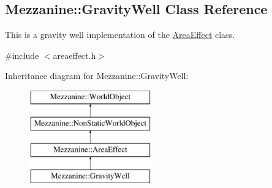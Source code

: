 \hypertarget{classMezzanine_1_1GravityWell}{
\subsection{Mezzanine::GravityWell Class Reference}
\label{classMezzanine_1_1GravityWell}
}


This is a gravity well implementation of the \hyperlink{classMezzanine_1_1AreaEffect}{AreaEffect} class.  




{\ttfamily \#include $<$areaeffect.h$>$}

Inheritance diagram for Mezzanine::GravityWell:\begin{figure}[H]
\begin{center}
\leavevmode
\includegraphics[height=4.000000cm]{classMezzanine_1_1GravityWell}
\end{center}
\end{figure}
